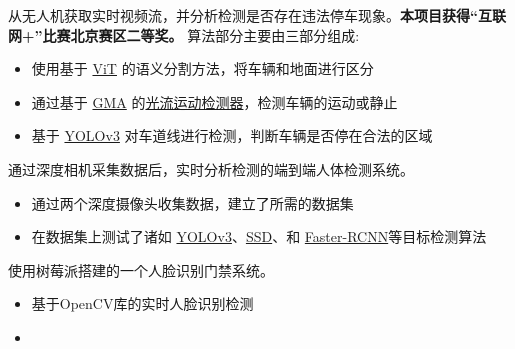 \documentclass{resume}
\begin{document}
从无人机获取实时视频流，并分析检测是否存在违法停车现象。\textbf{本项目获得“互联网+”比赛北京赛区二等奖。} 算法部分主要由三部分组成:
\begin{itemize}
  \item 使用基于 \href{https://arxiv.org/abs/2205.08534v3}{ViT} 的语义分割方法，将车辆和地面进行区分
  \item 通过基于 \href{https://arxiv.org/abs/2104.02409}{GMA} 的\href{https://github.com/open-mmlab/mmflow}{光流运动检测器}，检测车辆的运动或静止
  \item 基于 \href{https://arxiv.org/abs/1804.02767}{YOLOv3} 对车道线进行检测，判断车辆是否停在合法的区域
\end{itemize}

通过深度相机采集数据后，实时分析检测的端到端人体检测系统。
\begin{itemize}
  \item 通过两个深度摄像头收集数据，建立了所需的数据集
  \item 在数据集上测试了诸如 \href{https://arxiv.org/abs/1804.02767}{YOLOv3}、\href{https://arxiv.org/abs/1512.02325v5}{SSD}、和 \href{https://arxiv.org/abs/1506.01497v3}{Faster-RCNN}等目标检测算法
\end{itemize}

使用树莓派搭建的一个人脸识别门禁系统。
\begin{itemize}
  \item 基于OpenCV库的实时人脸识别检测 
  \item {}
\end{itemize}


\end{document}
